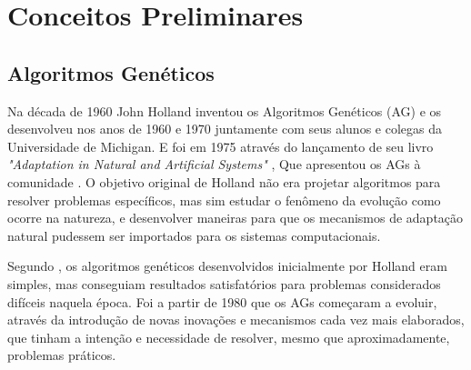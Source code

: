 ﻿\chapter{Conceitos Preliminares}
\label{cap:conceitos_preliminares}

\section{Algoritmos Genéticos}

Na década de 1960 John Holland inventou os Algoritmos Genéticos (AG) e os desenvolveu nos anos de 1960 e 1970 juntamente com seus alunos e colegas da Universidade de Michigan. E foi em 1975 através do lançamento de seu livro \textit{"Adaptation in Natural and Artificial Systems"} , Que \cite{holland75} apresentou os AGs à comunidade . O objetivo original de Holland não era projetar algoritmos para resolver problemas específicos, mas sim estudar o fenômeno da evolução como ocorre na natureza, e desenvolver maneiras para que os mecanismos de adaptação natural pudessem ser importados para os sistemas computacionais.

Segundo \cite{linden12}, os algoritmos genéticos desenvolvidos inicialmente por Holland eram simples, mas conseguiam resultados satisfatórios para problemas considerados difíceis naquela época. Foi a partir de 1980 que os AGs começaram a evoluir, através da introdução de novas inovações e mecanismos cada vez mais elaborados, que tinham a intenção e necessidade de resolver, mesmo que aproximadamente, problemas práticos.


